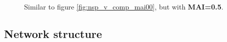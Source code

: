 \begin{figure}
	\centering	
	\renewcommand{\thesubfigure}{}
	\setlength{\subfloatlabelskip}{0pt}
	\caption[Number of initial species versus persistence, MAI=0.5.]{Similar to figure \ref{fig:nsp_v_comp_mai00}, but with \textbf{MAI=0.5}.}
	\label{fig:nsp_v_comp_mai05}
\end{figure}

\newpage
\subsection{Network structure}
\label{sec:netstruct_v_p}

